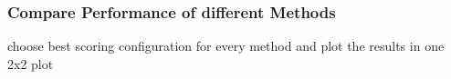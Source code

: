\documentclass[conference]{IEEEtran}
\begin{document}
\subsubsection{Compare Performance of different Methods}
choose best scoring configuration for every method and plot the results in one 2x2 plot

%
%



%
%
\end{document}
